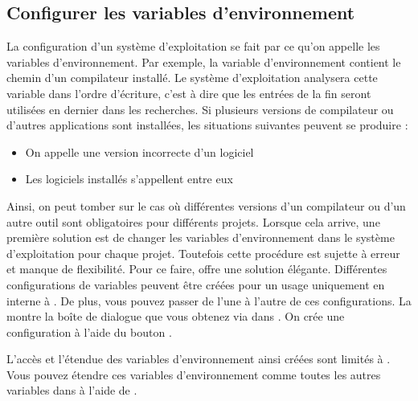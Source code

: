 \subsection{Configurer les variables  d'environnement}

La configuration d'un système d'exploitation se fait par ce qu'on appelle les variables d'environnement. Par exemple, la variable d'environnement  contient le chemin d'un compilateur installé. Le système d'exploitation analysera cette variable dans l'ordre d'écriture, c'est à dire que les entrées de la fin seront utilisées en dernier dans les recherches. Si plusieurs versions de compilateur ou d'autres applications sont installées, les situations suivantes peuvent se produire :

\begin{itemize}
\item On appelle une version incorrecte d'un logiciel
\item Les logiciels installés s'appellent entre eux
\end{itemize}

Ainsi, on peut tomber sur le cas où différentes versions d'un compilateur ou d'un autre outil sont obligatoires pour différents projets. Lorsque cela arrive, une première solution est de changer les variables d'environnement dans le système d'exploitation pour chaque projet. Toutefois cette procédure est sujette à erreur et manque de flexibilité. Pour ce faire, \codeblocks offre une solution élégante. Différentes configurations de variables peuvent être créées pour un usage uniquement en interne à \codeblocks. De plus, vous pouvez passer de l'une à l'autre de ces configurations. La  montre la boîte de dialogue que vous obtenez via  dans . On crée une configuration à l'aide du bouton .


L'accès et l'étendue des variables d'environnement ainsi créées sont limités à \codeblocks. Vous pouvez étendre ces variables d'environnement comme toutes les autres variables dans \codeblocks à l'aide de .



